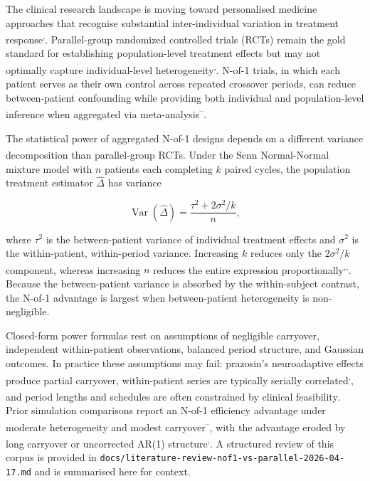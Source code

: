 \documentclass[
  11pt,
]{article}
\begin{document}
The clinical research landscape is moving toward personalised medicine
approaches that recognise substantial inter-individual variation in
treatment
response\textsuperscript{,}.
Parallel-group randomized controlled trials (RCTs) remain the gold
standard for establishing population-level treatment effects but may not
optimally capture individual-level
heterogeneity\textsuperscript{,}.
N-of-1 trials, in which each patient serves as their own control across
repeated crossover periods, can reduce between-patient confounding while
providing both individual and population-level inference when aggregated
via
meta-analysis\textsuperscript{--}.

The statistical power of aggregated N-of-1 designs depends on a
different variance decomposition than parallel-group RCTs. Under the
Senn\textsuperscript{}
Normal-Normal mixture model with \(n\) patients each completing \(k\)
paired cycles, the population treatment estimator \(\hat{\Delta}\) has
variance

\[\operatorname{Var}(\hat{\Delta}) =
  \frac{\tau^{2} + 2\sigma^{2}/k}{n},\]

where \(\tau^{2}\) is the between-patient variance of individual
treatment effects and \(\sigma^{2}\) is the within-patient,
within-period variance. Increasing \(k\) reduces only the
\(2\sigma^{2}/k\) component, whereas increasing \(n\) reduces the entire
expression
proportionally\textsuperscript{,,}.
Because the between-patient variance is absorbed by the within-subject
contrast, the N-of-1 advantage is largest when between-patient
heterogeneity is non-negligible.

Closed-form power formulas rest on assumptions of negligible carryover,
independent within-patient observations, balanced period structure, and
Gaussian outcomes. In practice these assumptions may fail: prazosin's
neuroadaptive effects produce partial
carryover\textsuperscript{},
within-patient series are typically serially
correlated\textsuperscript{,},
and period lengths and schedules are often constrained by clinical
feasibility\textsuperscript{}.
Prior simulation comparisons report an N-of-1 efficiency advantage under
moderate heterogeneity and modest
carryover\textsuperscript{--},
with the advantage eroded by long carryover or uncorrected AR(1)
structure\textsuperscript{,}.
A structured review of this corpus is provided in
\texttt{docs/literature-review-nof1-vs-parallel-2026-04-17.md} and is
summarised here for context.
\end{document}
